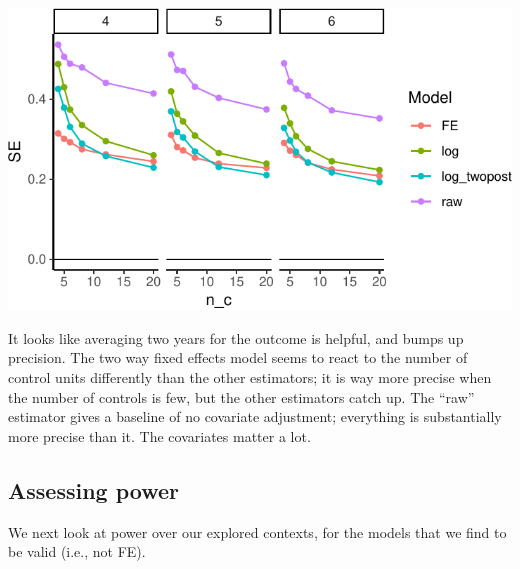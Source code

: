 \documentclass[
]{book}
\begin{document}
\begin{center}\includegraphics[width=0.75\linewidth]{Designing-Simulations-in-R_files/figure-latex/disc_precision-1} \end{center}

It looks like averaging two years for the outcome is helpful, and bumps up precision.
The two way fixed effects model seems to react to the number of control units differently than the other estimators; it is way more precise when the number of controls is few, but the other estimators catch up.
The ``raw'' estimator gives a baseline of no covariate adjustment; everything is substantially more precise than it.
The covariates matter a lot.

\subsection{Assessing power}\label{assessing-power-1}

We next look at power over our explored contexts, for the models that we find to be valid (i.e., not FE).
\end{document}
